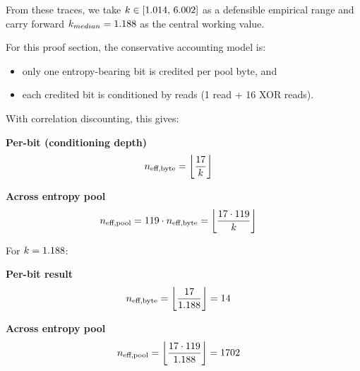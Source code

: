 \documentclass[titlepage]{report}
\begin{document}
		From these traces, we take $k\in[1.014,\,6.002]$ as a defensible empirical range and carry forward $k_{median}=1.188$ as the central working value.

		For this proof section, the conservative accounting model is:
	\begin{itemize}
		\item only one entropy-bearing bit is credited per pool byte, and
		\item each credited bit is conditioned by \CalibXorReads  reads (1 read + 16 XOR reads).
	\end{itemize}

		With correlation discounting, this gives:
	\begingroup
	\setlength{\abovedisplayskip}{4pt}
	\setlength{\abovedisplayshortskip}{4pt}
	\setlength{\belowdisplayskip}{4pt}
	\setlength{\belowdisplayshortskip}{4pt}
	\vspace{-0.35em}
	\begin{center}
		\begin{minipage}[t]{0.48\textwidth}
			\vspace{0pt}
			\textbf{Per-bit (conditioning depth)}
			\begin{align*}
				n_{\text{eff,byte}} &= \left\lfloor\frac{17}{k}\right\rfloor
			\end{align*}
		\end{minipage}\hfill
		\begin{minipage}[t]{0.48\textwidth}
			\vspace{0pt}
				\textbf{Across entropy pool}
			\begin{align*}
				n_{\text{eff,pool}} &= 119\cdot n_{\text{eff,byte}} = \left\lfloor\frac{17\cdot119}{k}\right\rfloor
			\end{align*}
		\end{minipage}
	\end{center}
	\vspace{-0.35em}
	\endgroup
	For $k=1.188$:
	\begingroup
	\setlength{\abovedisplayskip}{4pt}
	\setlength{\abovedisplayshortskip}{4pt}
	\setlength{\belowdisplayskip}{4pt}
	\setlength{\belowdisplayshortskip}{4pt}
	\vspace{-0.35em}
	\begin{center}
		\begin{minipage}[t]{0.48\textwidth}
			\vspace{0pt}
			\textbf{Per-bit result}
			\begin{align*}
				n_{\text{eff,byte}}&=\left\lfloor\frac{17}{1.188}\right\rfloor=14
			\end{align*}
		\end{minipage}\hfill
		\begin{minipage}[t]{0.48\textwidth}
			\vspace{0pt}
				\textbf{Across entropy pool}
			\begin{align*}
				n_{\text{eff,pool}}&=\left\lfloor\frac{17\cdot119}{1.188}\right\rfloor=1702
			\end{align*}
		\end{minipage}
	\end{center}
	\vspace{-0.35em}
	\endgroup
	
\end{document}
